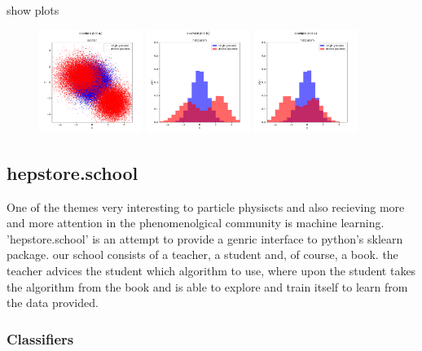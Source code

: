 \documentclass[aps,prd,11pt,tightenlines,superscriptaddress,nofootinbib,preprintnumbers,notitlepage]{revtex4-1}
\begin{document}
%
show plots
%
\begin{figure}
  \centering
  \includegraphics[width=0.3\textwidth]{../examples/hepstore_plot/example_a.pdf}
  \includegraphics[width=0.3\textwidth]{../examples/hepstore_plot/example_b.pdf}
  \includegraphics[width=0.3\textwidth]{../examples/hepstore_plot/example_c.pdf}
  \caption{}
  \label{fig:example_plotting}
\end{figure}
%


\subsection{hepstore.school}

One of the themes very interesting to particle physiscts and also recieving more and more attention in the phenomenolgical community is machine learning. 'hepstore.school' is an attempt to provide a genric interface to python's sklearn package. our school consists of a teacher, a student and, of course, a book. the teacher advices the student which algorithm to use, where upon the student takes the algorithm from the book and is able to explore and train itself to learn from the data provided.

\subsubsection{Classifiers}
\end{document}
